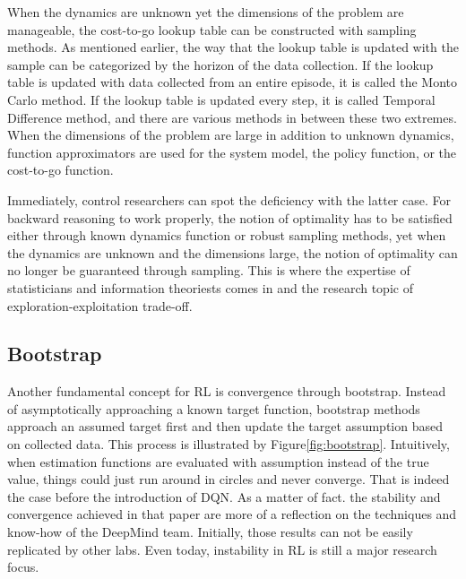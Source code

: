 \documentclass[journal]{IEEEtran}
\begin{document}
When the dynamics are unknown yet the dimensions of the problem are manageable, the cost-to-go lookup table can be constructed with sampling methods. As mentioned earlier, the way that the lookup table is updated with the sample can be categorized by the horizon of the data collection. If the lookup table is updated with data collected from an entire episode, it is called the Monto Carlo method. If the lookup table is updated every step, it is called Temporal Difference method, and there are various methods in between these two extremes. When the dimensions of the problem are large in addition to unknown dynamics, function approximators are used for the system model, the policy function, or the cost-to-go function. 

Immediately, control researchers can spot the deficiency with the latter case. For backward reasoning to work properly, the notion of optimality has to be satisfied either through known dynamics function or robust sampling methods, yet when the dynamics are unknown and the dimensions large, the notion of optimality can no longer be guaranteed through sampling. This is where the expertise of statisticians and information theoriests comes in and the research topic of exploration-exploitation trade-off.

\subsection{Bootstrap}

Another fundamental concept for RL is convergence through bootstrap. Instead of asymptotically approaching a known target function, bootstrap methods approach an assumed target first and then update the target assumption based on collected data. This process is illustrated by Figure\ref{fig:bootstrap}. Intuitively, when estimation functions are evaluated with assumption instead of the true value, things could just run around in circles and never converge. That is indeed the case before the introduction of DQN\cite{Osband2016DeepEV}. As a matter of fact. the stability and convergence achieved in that paper are more of a reflection on the techniques and know-how of the DeepMind team. Initially, those results can not be easily replicated by other labs. Even today, instability in RL is still a major research focus. 
\end{document}
